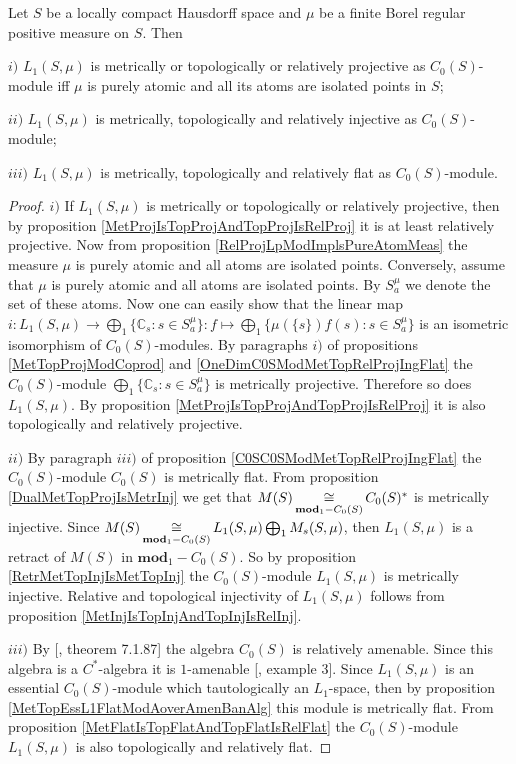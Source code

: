 \begin{proposition}\label{L1C0SModMetTopRelProjInjFlat}
Let $S$ be a locally compact Hausdorff space and $\mu$ be a finite Borel regular positive measure on $S$. Then 

$i)$ $L_1(S,\mu)$ is metrically or topologically or relatively projective as $C_0(S)$-module iff $\mu$ is purely atomic and all its atoms are isolated points in $S$;

$ii)$ $L_1(S,\mu)$ is metrically, topologically and relatively injective as $C_0(S)$-module;

$iii)$ $L_1(S,\mu)$ is metrically, topologically and relatively flat as $C_0(S)$-module.
\end{proposition}
\begin{proof} $i)$ If $L_1(S,\mu)$ is metrically or topologically or relatively projective, then by proposition \ref{MetProjIsTopProjAndTopProjIsRelProj} it is at least relatively projective. Now from proposition \ref{RelProjLpModImplsPureAtomMeas} the measure $\mu$ is purely atomic and all atoms are isolated  points. Conversely, assume that $\mu$ is purely atomic and all atoms are isolated points. By $S_a^{\mu}$ we denote the set of these atoms. Now one can easily show that the linear map $i:L_1(S,\mu)\to\bigoplus_1\{\mathbb{C}_s:s\in S_a^{\mu}\}:f\mapsto \bigoplus_1\{\mu(\{s\})f(s):s\in S_a^{\mu}\}$ is an isometric isomorphism of $C_0(S)$-modules. By paragraphs $i)$ of propositions \ref{MetTopProjModCoprod} and \ref{OneDimC0SModMetTopRelProjIngFlat} the $C_0(S)$-module $\bigoplus_1\{\mathbb{C}_s:s\in S_a^{\mu}\}$ is metrically projective. Therefore so does $L_1(S,\mu)$. By proposition \ref{MetProjIsTopProjAndTopProjIsRelProj} it is also topologically and relatively projective.

$ii)$ By paragraph $iii)$ of proposition \ref{C0SC0SModMetTopRelProjIngFlat} the $C_0(S)$-module $C_0(S)$ is metrically flat. From proposition \ref{DualMetTopProjIsMetrInj} we get that $M(S)\mathop{\mathbin{\cong}}\limits_{\mathbf{mod}_1-C_0(S)}C_0(S)^*$ is metrically injective. Since $M(S)\mathop{\mathbin{\cong}}\limits_{\mathbf{mod}_1-C_0(S)}L_1(S,\mu)\bigoplus_1 M_s(S,\mu)$, then $L_1(S,\mu)$ is a retract of $M(S)$ in $\mathbf{mod}_1-C_0(S)$. So by proposition \ref{RetrMetTopInjIsMetTopInj} the $C_0(S)$-module $L_1(S,\mu)$ is metrically injective. Relative and topological injectivity of $L_1(S,\mu)$ follows from proposition \ref{MetInjIsTopInjAndTopInjIsRelInj}.

$iii)$ By [\cite{HelBanLocConvAlg}, theorem 7.1.87] the algebra $C_0(S)$ is relatively amenable. Since this algebra is a $C^*$-algebra it is $1$-amenable [\cite{RundeAmenConstFour}, example 3]. Since $L_1(S,\mu)$ is an essential $C_0(S)$-module which tautologically an $L_1$-space, then by proposition \ref{MetTopEssL1FlatModAoverAmenBanAlg} this module is metrically flat. From proposition \ref{MetFlatIsTopFlatAndTopFlatIsRelFlat} the $C_0(S)$-module $L_1(S,\mu)$ is also topologically and relatively flat.
\end{proof}

